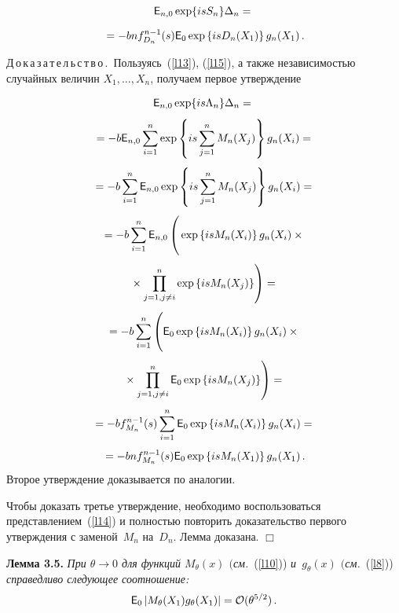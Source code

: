 \begin{multicols}{2}
\noindent
\begin{multline*}
{{\sf E}}_{n,0}\exp\{isS_n\}\Delta_n ={}\\[6pt]
{}= -b n f^{n-1}_{D_n}(s) {{\sf E}}_0 \exp\left\{isD_n(X_1)\right\} g_n(X_1)\,.
\end{multline*}


\medskip

\noindent
Д\,о\,к\,а\,з\,а\,т\,е\,л\,ь\,с\,т\,в\,о\,.\
 Пользуясь~(\ref{l13}), (\ref{l15}), а также независимостью случайных величин $X_1, \dots, X_n$, 
 получаем первое утверждение
 
 \noindent
\begin{multline*}
{\e}_{n,0}\exp\{is\Lambda_n\}\Delta_n ={}\\[4pt]
{}
= -b  {\e}_{n,0}\sum_{i=1}^n \exp\left\{is\sum_{j=1}^n M_n(X_j)\right\} g_n(X_i)={}\\[4pt]
{}
= -b \sum\limits_{i=1}^n {\e}_{n,0} \exp\left\{is\sum_{j=1}^n M_n(X_j)\right\} g_n(X_i) ={}\\[4pt]
{}
= -b \sum\limits_{i=1}^n {\e}_{n,0}\left(
\vphantom{\prod^n_{j=1}}
\exp\left\{isM_n(X_i)\right\} g_n(X_i) \times{}\right.\\[4pt]
\left.{}\times \prod\limits_{j=1,  j\ne i}^n \exp\left\{isM_n(X_j)\right\} \right) ={}\\[4pt]
{}
= -b \sum\limits_{i=1}^n \left(
\vphantom{\prod^n_{j=1}}
{\e}_0 \exp\left\{isM_n(X_i)\right\} g_n(X_i) \times {}\right.\\[4pt]
\left.{}\times
\prod\limits_{j=1,j\ne i}^n {\e}_0 \exp\left\{isM_n(X_j)\right\}\right) ={}\\[4pt]
{}
= -b  f_{M_n}^{n-1}(s)  \sum\limits_{i=1}^n {\e}_0 \exp\left\{isM_n(X_i)\right\} g_n(X_i) ={}\\[4pt]
{}
= -b n f^{n-1}_{M_n}(s) {\e}_0 \exp\left\{isM_n(X_1)\right\} g_n(X_1)\,.
\end{multline*}
Второе утверждение доказывается по аналогии.


Чтобы доказать третье утверждение, необходимо воспользоваться представлением~(\ref{l14}) и 
пол\-ностью повторить доказательство первого утверж\-дения с заменой~$M_n$ на~$D_n$. Лемма доказана.
\hfill $\Box$

\medskip


\noindent
\textbf{Лемма 3.5.}
\textit{При $\theta \to 0$ для функций $M_{\theta}(x)$ $($см.}~(\ref{l10})) \textit{и~$g_{\theta}(x)$ 
$($см.}~(\ref{l8})) 
\textit{справедливо следующее соотношение:}
$$
{{\sf E}}_0 \left|M_{\theta}(X_1) g_{\theta}(X_1)\right| = {\cal O}(\theta^{5/2})\,.
$$



\end{multicols}
